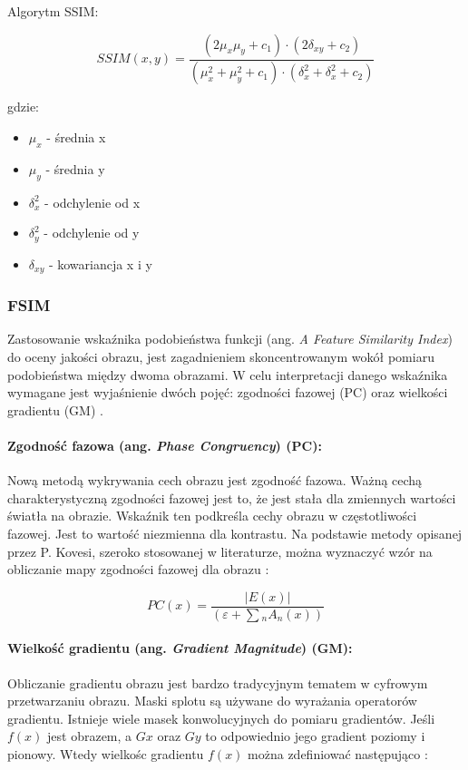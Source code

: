\documentclass{article}
\begin{document}
Algorytm SSIM:

\begin{equation}
  SSIM(x, y) = \frac{(2\mu_{x}\mu_{y} + c_{1}) \cdot (2\delta_{xy} + c_2)}{(\mu_{x}^2 + \mu_{y}^2 + c_{1}) \cdot (\delta_{x}^2 + \delta_{x}^2 + c_2)}
\end{equation}

gdzie:
\begin{itemize}[label=]
  \item $\mu_{x}$ - średnia x
  \item $\mu_{y}$ - średnia y
  \item $\delta_{x}^2$ - odchylenie od x
  \item $\delta_{y}^2$ - odchylenie od y
  \item $\delta_{xy}$ - kowariancja x i y
\end{itemize}

\subsubsection{FSIM}

Zastosowanie wskaźnika podobieństwa funkcji (ang. \emph{A Feature Similarity Index}) do oceny jakości obrazu, 
jest zagadnieniem skoncentrowanym wokół pomiaru podobieństwa między dwoma obrazami.
W celu interpretacji danego wskaźnika wymagane jest wyjaśnienie dwóch pojęć: zgodności fazowej (PC) oraz wielkości gradientu (GM) \cite{fsim_theory}.

\paragraph{Zgodność fazowa (ang. \emph{Phase Congruency}) (PC):}
Nową metodą wykrywania cech obrazu jest zgodność fazowa. Ważną cechą charakterystyczną zgodności fazowej jest to,
że jest stała dla zmiennych wartości światła na obrazie. Wskaźnik ten podkreśla cechy obrazu w częstotliwości fazowej. 
Jest to wartość niezmienna dla kontrastu. Na podstawie metody opisanej przez P. Kovesi, szeroko stosowanej w literaturze, 
można wyznaczyć wzór na obliczanie mapy zgodności fazowej dla obrazu \cite{pc}:

\begin{equation}
  PC(x) = \frac{|E(x)|}{(\varepsilon + \sum\limits{_{n}} A_n(x))}
\end{equation}

\paragraph{Wielkość gradientu  (ang. \emph{Gradient Magnitude}) (GM):}
Obliczanie gradientu obrazu jest bardzo tradycyjnym tematem w cyfrowym przetwarzaniu obrazu. 
Maski splotu są używane do wyrażania operatorów gradientu. Istnieje wiele masek konwolucyjnych do pomiaru gradientów. 
Jeśli $f(x)$ jest obrazem, a $Gx$ oraz $Gy$ to odpowiednio jego gradient poziomy i pionowy. 
Wtedy wielkośc gradientu $f(x)$ można zdefiniować następująco \cite{gm}:
\end{document}
